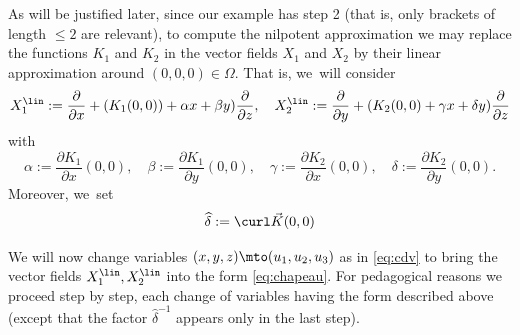 As will be justified later, since our example has step 2 (that is, only brackets of length $\leq 2$ are relevant), to compute the nilpotent approximation we may replace the functions $K_1$ and $K_2$ in the vector fields $X_1$ and $X_2$ by their linear approximation around $(0,0,0)\in\Omega$. That is, we~will consider
\[
X_1^\lin := \frac{\partial}{\partial x} + (K_1(0,0)) + \alpha x + \beta y) \frac{\partial}{\partial z},\quad
X_2^\lin := \frac{\partial}{\partial y} +(K_2 (0,0) + \gamma x + \delta y) \frac{\partial}{\partial z}
\]
with
\[
\alpha := \frac{\partial K_1}{\partial x} (0,0),
\quad
\beta := \frac{\partial K_1}{\partial y} (0,0),
\quad
\gamma := \frac{\partial K_2}{\partial x} (0,0),
\quad
\delta := \frac{\partial K_2}{\partial y} (0,0).
\]
Moreover, we~set
\[
\widehat \delta := \curl \vec K (0,0)
\]

We will now change variables $(x,y,z)\mto (u_1,u_2,u_3)$ as in \eqref{eq:cdv} to bring the vector fields $X_1^\lin, X_2^\lin$ into the form \eqref{eq:chapeau}. For pedagogical reasons we proceed step by step, each change of variables having the form described above (except that the factor $\widehat\delta^{-1}$ appears only in the last step).
